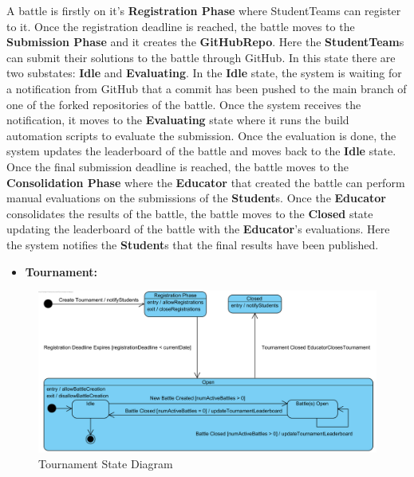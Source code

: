 \documentclass{article}
\begin{document}
A battle is firstly on it's \textbf{Registration Phase} where StudentTeams can register to 
it. Once the registration deadline is reached, the battle moves to the 
\textbf{Submission Phase} and it creates the \textbf{GitHubRepo}. Here the \textbf{StudentTeam}s  
can submit their solutions to the battle 
through GitHub. In this state there are two substates: \textbf{Idle} and \textbf{Evaluating}. 
In the \textbf{Idle} state, the system is waiting for a notification from GitHub that a commit 
has been pushed to the main branch of one of the forked repositories of the battle. Once the system 
receives the notification, it moves to the \textbf{Evaluating} state where it runs the build 
automation scripts to evaluate the submission. Once the evaluation is done, the system updates 
the leaderboard of the battle and moves back to the \textbf{Idle} state. Once the final submission 
deadline is reached, the battle moves to the \textbf{Consolidation Phase} where the \textbf{Educator} that 
created the battle can perform manual evaluations on the submissions of the \textbf{Student}s. 
Once the \textbf{Educator} consolidates the results of the battle, the battle moves to the \textbf{Closed} 
state updating the leaderboard of the battle with the \textbf{Educator}'s evaluations. Here the system 
notifies the \textbf{Student}s that the final results have been published.

\begin{itemize}
    \item \textbf{Tournament:}
\end{itemize}

\begin{figure}[!h]
    \centering
    \includegraphics[width=1\textwidth]{images/TournamentStateDiagram.png}
    \caption{Tournament State Diagram}
    \label{fig:TournamentStateDiagram}
\end{figure}
\end{document}
